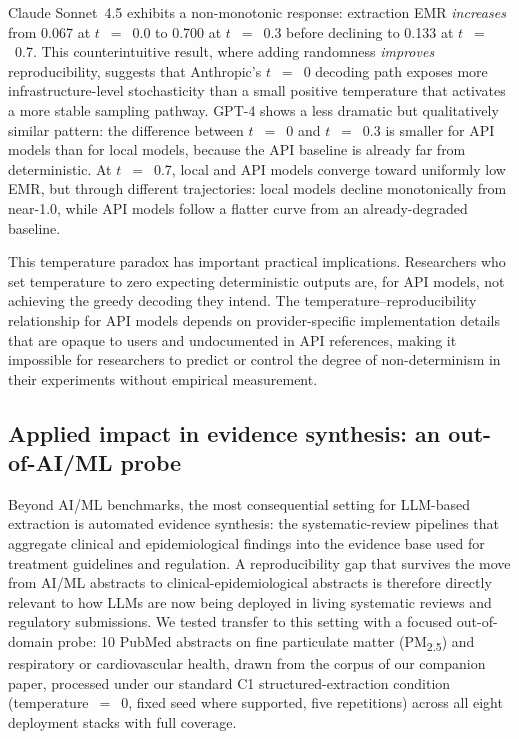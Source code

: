 \documentclass[sn-nature]{sn-jnl}
\begin{document}
Claude Sonnet~4.5 exhibits a non-monotonic response: extraction EMR \emph{increases} from 0.067 at $t$~$=$~0.0 to 0.700 at $t$~$=$~0.3 before declining to 0.133 at $t$~$=$~0.7.
This counterintuitive result, where adding randomness \emph{improves} reproducibility, suggests that Anthropic's $t$~$=$~0 decoding path exposes more infrastructure-level stochasticity than a small positive temperature that activates a more stable sampling pathway.
GPT-4 shows a less dramatic but qualitatively similar pattern: the difference between $t$~$=$~0 and $t$~$=$~0.3 is smaller for API models than for local models, because the API baseline is already far from deterministic.
At $t$~$=$~0.7, local and API models converge toward uniformly low EMR, but through different trajectories: local models decline monotonically from near-1.0, while API models follow a flatter curve from an already-degraded baseline.

This temperature paradox has important practical implications.
Researchers who set temperature to zero expecting deterministic outputs are, for API models, not achieving the greedy decoding they intend.
The temperature--reproducibility relationship for API models depends on provider-specific implementation details that are opaque to users and undocumented in API references\cite{openai2024seed}, making it impossible for researchers to predict or control the degree of non-determinism in their experiments without empirical measurement.


\subsection{Applied impact in evidence synthesis: an out-of-AI/ML probe}\label{subsec:pubmed}

Beyond AI/ML benchmarks, the most consequential setting for LLM-based extraction is automated evidence synthesis: the systematic-review pipelines that aggregate clinical and epidemiological findings into the evidence base used for treatment guidelines and regulation.
A reproducibility gap that survives the move from AI/ML abstracts to clinical-epidemiological abstracts is therefore directly relevant to how LLMs are now being deployed in living systematic reviews and regulatory submissions.
We tested transfer to this setting with a focused out-of-domain probe: 10 PubMed abstracts on fine particulate matter (PM\textsubscript{2.5}) and respiratory or cardiovascular health, drawn from the corpus of our companion paper\cite{rover2026evidence}, processed under our standard C1 structured-extraction condition (temperature~$=$~0, fixed seed where supported, five repetitions) across all eight deployment stacks with full coverage.
\end{document}
